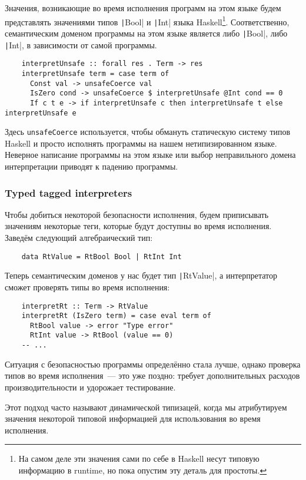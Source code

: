 Значения, возникающие во время исполнения программ на этом языке будем представлять значениями типов \texttt|Bool| и \texttt|Int| языка Haskell\footnote{На самом деле эти значения сами по себе в Haskell несут типовую информацию в runtime, но пока опустим эту деталь для простоты.}.
Соответственно, семантическим доменом программы на этом языке является либо \texttt|Bool|, либо \texttt|Int|, в зависимости от самой программы.
\begin{verbatim}
    interpretUnsafe :: forall res . Term -> res
    interpretUnsafe term = case term of
      Const val -> unsafeCoerce val
      IsZero cond -> unsafeCoerce $ interpretUnsafe @Int cond == 0
      If c t e -> if interpretUnsafe c then interpretUnsafe t else interpretUnsafe e
\end{verbatim}

Здесь \texttt{unsafeCoerce} используется, чтобы обмануть статическую систему типов Haskell и просто исполнять программы на нашем нетипизированном языке.
Неверное написание программы на этом языке или выбор неправильного домена интерпретации приводят к падению программы.

\subsubsection{Typed tagged interpreters}

Чтобы добиться некоторой безопасности исполнения, будем приписывать значениям некоторые теги, которые будут доступны во время исполнения.
Заведём следующий алгебраический тип:
\begin{verbatim}
    data RtValue = RtBool Bool | RtInt Int
\end{verbatim}

Теперь семантическим доменов у нас будет тип \texttt|RtValue|, а интерпретатор сможет проверять типы во время исполнения:
\begin{verbatim}
    interpretRt :: Term -> RtValue
    interpretRt (IsZero term) = case eval term of
      RtBool value -> error "Type error"
      RtInt value -> RtBool (value == 0)
    -- ...
\end{verbatim}

Ситуация с безопасностью программы определённо стала лучше, однако проверка типов во время исполнения~--- это уже поздно: требует дополнительных расходов производительности и удорожает тестирование.

Этот подход часто называют динамической типизацей, когда мы атрибутируем значения некоторой типовой информацией для использования во время исполнения.


